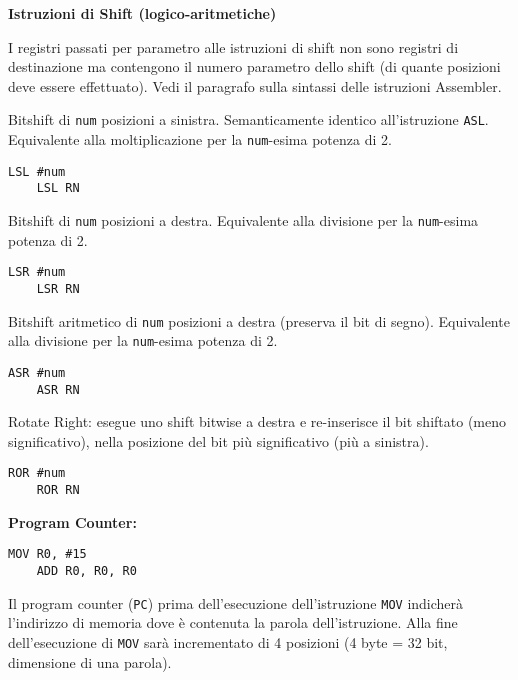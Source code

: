 \begin{defn}
	\textbf{Istruzioni di Shift (logico-aritmetiche)}
	
	\begin{note}
		I registri passati per parametro alle istruzioni di shift non sono registri di destinazione ma contengono il numero parametro dello shift (di quante posizioni deve essere effettuato). Vedi il paragrafo sulla sintassi delle istruzioni Assembler.
	\end{note}
	
	Bitshift di \verb|num| posizioni a sinistra. Semanticamente identico all'istruzione \verb|ASL|. Equivalente alla moltiplicazione per la \verb|num|-esima potenza di 2.
	\begin{lstlisting}[style=arm]
	LSL #num 
	LSL RN 
	\end{lstlisting}
	
	Bitshift di \verb|num| posizioni a destra. Equivalente alla divisione per la \verb|num|-esima potenza di 2.
	\begin{lstlisting}[style=arm]
	LSR #num 
	LSR RN 
	\end{lstlisting}
	
	
	Bitshift aritmetico di \verb|num| posizioni a destra (preserva il bit di segno). Equivalente alla divisione per la \verb|num|-esima potenza di 2.
	\begin{lstlisting}[style=arm]
	ASR #num 
	ASR RN 
	\end{lstlisting}
	
	
	
	Rotate Right: esegue uno shift bitwise a destra e re-inserisce il bit shiftato (meno significativo), nella posizione del bit più significativo (più a sinistra).
	\begin{lstlisting}[style=arm]
	ROR #num
	ROR RN
	\end{lstlisting}
	
\end{defn}


\begin{exmp}
	\textbf{Program Counter:}
	
	
	\begin{lstlisting}[style=arm]
	MOV R0, #15
	ADD R0, R0, R0
	\end{lstlisting}
	
	
	Il program counter (\verb|PC|) prima dell'esecuzione dell'istruzione \verb|MOV| indicherà l'indirizzo di memoria dove è contenuta la parola dell'istruzione. Alla fine dell'esecuzione di \verb|MOV| sarà incrementato di 4 posizioni (4 byte = 32 bit, dimensione di una parola).
\end{exmp}

